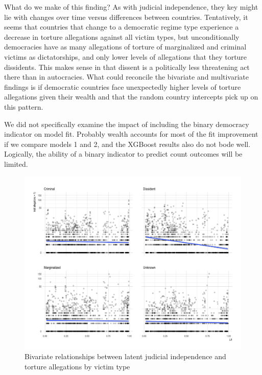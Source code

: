 \documentclass[12pt]{article}
\begin{document}
What do we make of this finding? As with judicial independence, they key might lie with changes over time versus differences between countries. Tentatively, it seems that countries that change to a democratic regime type experience a decrease in torture allegations against all victim types, but unconditionally democracies have as many allegations of torture of marginalized and criminal victims as dictatorships, and only lower levels of allegations that they torture dissidents. This makes sense in that dissent is a politically less threatening act there than in autocracies. What could reconcile the bivariate and multivariate findings is if democratic countries face unexpectedly higher levels of torture allegations given their wealth and that the random country intercepts pick up on this pattern. 

We did not specifically examine the impact of including the binary democracy indicator on model fit. Probably wealth accounts for most of the fit improvement if we compare models 1 and 2, and the XGBoost results also do not bode well. Logically, the ability of a binary indicator to predict count outcomes will be limited. 

\begin{figure}
\begin{center}
\caption{Bivariate relationships between latent judicial independence and torture allegations by victim type}
\label{fig:lji-bivariate}
\includegraphics[width=.7\textwidth]{../output/scatterplot-itt-allegations-v-lji.png}
\end{center}
\end{figure}
\end{document}
